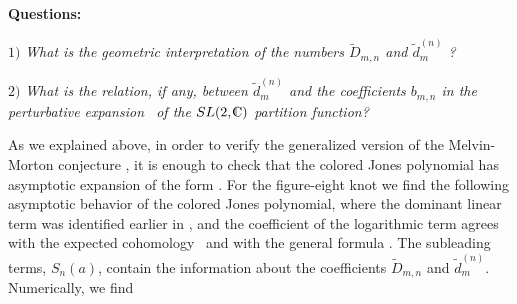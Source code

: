 \noindent
{\bf Questions:}

\item{$1)$}
{\it What is the geometric interpretation of
the numbers $\tilde D_{m,n}$ and $\tilde d_m^{(n)}$ ?}

\item{$2)$}
{\it What is the relation, if any, between $\tilde d_m^{(n)}$
and the coefficients $b_{m,n}$ in the perturbative
expansion \pertz\ of the $SL(2,\IC)$ partition function?}


%
%




As we explained above, in order to verify the generalized
version of the Melvin-Morton conjecture \newmmconj,
it is enough to check that the colored Jones polynomial
has asymptotic expansion of the form \lognjones.
For the figure-eight knot we find the following asymptotic
behavior of the colored Jones polynomial,
%
\eqn{}
%
where the dominant linear term was identified earlier
in \kashlimiteight, and the coefficient of the logarithmic term
agrees with the expected cohomology \hhzero\
and with the general formula \lognjones.
The subleading terms, $S_n(a)$, contain the information
about the coefficients $\tilde D_{m,n}$ and $\tilde d_m^{(n)}$.
Numerically, we find

